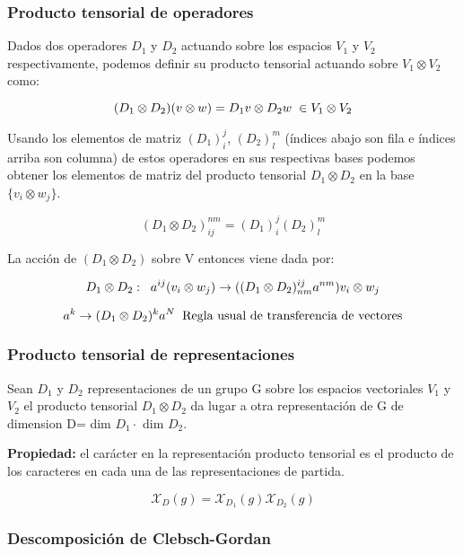 \documentclass{article}
\begin{document}
    \subsubsection{Producto tensorial de operadores}

    Dados dos operadores $D_1$ y $D_2$ actuando sobre los espacios $V_1$ y $V_2$ respectivamente, podemos definir su producto tensorial actuando sobre $V_1 \otimes V_2$ como:

    $$(D_1\otimes D_2)(v\otimes w)=D_1v \otimes D_2w  \hspace{0.1cm} \in V_1 \otimes V_2$$

Usando los elementos de matriz $(D_1)^j_i$, $(D_2)^m_l$ (índices abajo son fila e índices arriba son columna) de estos operadores en sus respectivas bases podemos obtener los elementos de matriz del producto tensorial $D_1 \otimes D_2$ en la base $\lbrace v_i\otimes w_j \rbrace$.

$$(D_1 \otimes D_2)^{nm}_{ij}=(D_1)^j_i (D_2)^m_l$$

La acción de $(D_1\otimes D_2)$ sobre V entonces viene dada por:

$$D_1 \otimes D_2: \hspace{0.2cm} a^{ij} (v_i\otimes w_j) \to ((D_1 \otimes D_2)^{ij}_{nm}a^{nm})v_i\otimes w_j$$

    $$a^k \to (D_1\otimes D_2)^ka^N \hspace{0.2cm} \text{Regla usual de transferencia de vectores}$$

\subsubsection{Producto tensorial de representaciones}

Sean $D_1$ y $D_2$ representaciones de un grupo G sobre los espacios vectoriales $V_1$ y $V_2$ el producto tensorial $D_1 \otimes D_2$ da lugar a otra representación de G de dimension D= dim $D_1 \cdot$ dim $D_2$.

\smallskip
\textbf{Propiedad:} el carácter en la representación producto tensorial es el producto de los caracteres en cada una de las representaciones de partida.

$$\mathcal{X}_D(g)=\mathcal{X}_{D_1}(g)\mathcal{X}_{D_2}(g)$$

\subsubsection{Descomposición de Clebsch-Gordan}
\end{document}
